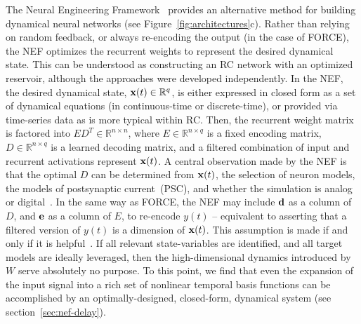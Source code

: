
The Neural Engineering Framework~\citep[NEF;][]{eliasmith1999developing,eliasmith2003a} provides an alternative method for building dynamical neural networks (see Figure~\ref{fig:architectures}c).
Rather than relying on random feedback, or always re-encoding the output (in the case of FORCE), the NEF optimizes the recurrent weights to represent the desired dynamical state.
This can be understood as constructing an RC network with an optimized reservoir, although the approaches were developed independently.
In the NEF, the desired dynamical state, $\mathbf{x}(t) \in \mathbb{R}^q$, is either expressed in closed form as a set of dynamical equations (in continuous-time or discrete-time), or provided via time-series data as is more typical within RC.
Then, the recurrent weight matrix is factored into $ED^T \in \mathbb{R}^{n \times n}$, where $E \in \mathbb{R}^{n \times q}$ is a fixed encoding matrix, $D \in \mathbb{R}^{n \times q}$ is a learned decoding matrix, and a filtered combination of input and recurrent activations represent $\mathbf{x}(t)$.
A central observation made by the NEF is that the optimal $D$ can be determined from $\mathbf{x}(t)$, the selection of neuron models, the models of postsynaptic current~(PSC), and whether the simulation is analog or digital~\citep{voelker2018}.
In the same way as FORCE, the NEF may include $\mathbf{d}$ as a column of $D$, and $\mathbf{e}$ as a column of $E$, to re-encode $y(t)$ -- equivalent to asserting that a filtered version of $y(t)$ is a dimension of $\mathbf{x}(t)$.
This assumption is made if and only if it is helpful~\citep[e.g.,~to perform integration;][]{singh2004}.
If all relevant state-variables are identified, and all target models are ideally leveraged, then the high-dimensional dynamics introduced by $W$ serve absolutely no purpose.
To this point, we find that even the expansion of the input signal into a rich set of nonlinear temporal basis functions can be accomplished by an optimally-designed, closed-form, dynamical system (see section~\ref{sec:nef-delay}).

